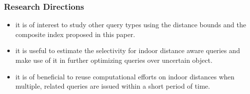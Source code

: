 
\begin{frame}
  \frametitle{Research Directions}

  \begin{itemize}
  	\item it is of interest to study other query types using the distance bounds and the composite index proposed in this paper.
    \item it is useful to estimate the selectivity for indoor distance aware queries and make use of it in further optimizing queries over uncertain object.
    \item it is of beneficial to reuse computational efforts on indoor distances when multiple, related queries are issued within a short period of time.
  \end{itemize}

\end{frame}
